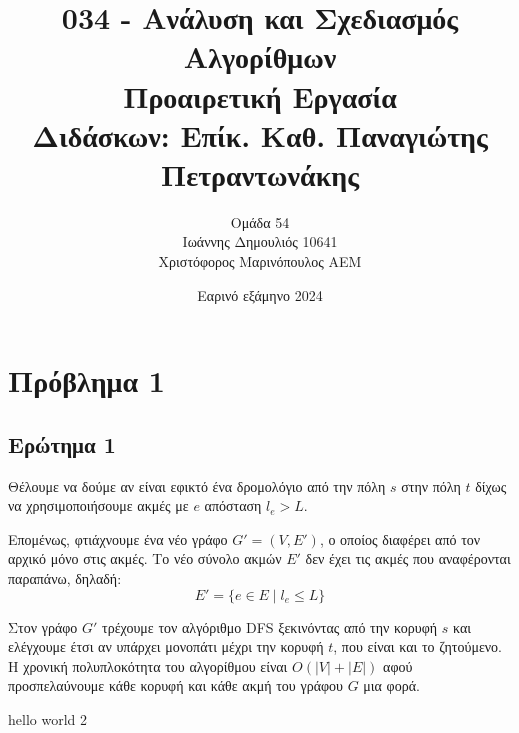 \documentclass[10pt]{article}
\title{\vspace{-2cm}034 - Ανάλυση και Σχεδιασμός Αλγορίθμων\\ 
         Προαιρετική Εργασία \\
         \large Διδάσκων: Επίκ. Καθ. Παναγιώτης Πετραντωνάκης}
\author{Ομάδα 54 \\
        Ιωάννης Δημουλιός 10641 \\
        Χριστόφορος Μαρινόπουλος ΑΕΜ}
\date{Εαρινό εξάμηνο 2024}
\begin{document}
\maketitle
\section*{Πρόβλημα 1}
\subsection*{Ερώτημα 1}
Θέλουμε να δούμε αν είναι εφικτό ένα δρομολόγιο από την πόλη \(s\) στην πόλη \(t\) δίχως να χρησιμοποιήσουμε ακμές με \(e\) απόσταση \(l_e > L\). 

Επομένως, φτιάχνουμε ένα νέο γράφο \(G' = (V, E')\), ο οποίος διαφέρει από τον αρχικό μόνο στις ακμές. Το νέο σύνολο ακμών \(E'\) δεν έχει τις ακμές που αναφέρονται παραπάνω, δηλαδή: 
\[
    E' = \{e \in E \mid l_e \leq L\}
\]

Στον γράφο \(G'\) τρέχουμε τον αλγόριθμο DFS ξεκινόντας από την κορυφή \(s\) και ελέγχουμε έτσι αν υπάρχει μονοπάτι μέχρι την κορυφή \(t\), που είναι και το ζητούμενο. 
Η χρονική πολυπλοκότητα του αλγορίθμου είναι \(O(|V| + |E|)\) αφού προσπελαύνουμε κάθε κορυφή και κάθε ακμή του γράφου \(G\) μια φορά. 



\newpage
hello world 2
\end{document}
